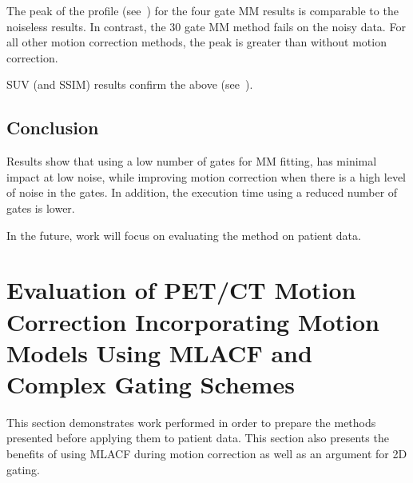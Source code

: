             The peak of the profile (see~) for the four gate \gls{MM} results is comparable to the noiseless results. In contrast, the $30$ gate \gls{MM} method fails on the noisy data. For all other motion correction methods, the peak is greater than without motion correction.
             
            \gls{SUV} (and \gls{SSIM}) results confirm the above (see~).

        \subsection{Conclusion} \label{sec:pet_ct_motion_correction_exploiting_motion_models_fit_on_coarsely_gated_data_applied_to_finely_gated_data_conclusion}
            Results show that using a low number of gates for \gls{MM} fitting, has minimal impact at low noise, while improving motion correction when there is a high level of noise in the gates. In addition, the execution time using a reduced number of gates is lower.
            
            In the future, work will focus on evaluating the method on patient data.

    \section{Evaluation of PET/CT Motion Correction Incorporating Motion Models Using MLACF and Complex Gating Schemes} \label{sec:evaluation_of_pet_ct_motion_correction_incorporating_motion_models_using_mlacf_and_complex_gating_schemes}
        This section demonstrates work performed in order to prepare the methods presented before applying them to patient data. This section also presents the benefits of using \gls{MLACF} during motion correction as well as an argument for \gls{2D} gating.

